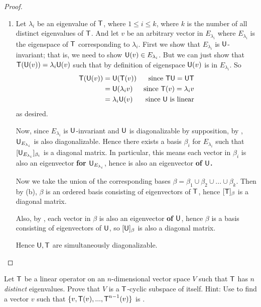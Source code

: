 \begin{proof} \ 

\begin{enumerate}
\item

Let \(\lambda_i\) be an eigenvalue of \(\textsf{T}\), where \(1 \le i \le k\), where \(k\) is the number of all distinct eigenvalues of \(\textsf{T}\).
And let \(v\) be an arbitrary vector in \(E_{\lambda_i}\) where \(E_{\lambda_i}\) is the eigenspace of \(\textsf{T}\) corresponding to \(\lambda_i\).
First we show that \(E_{\lambda_i}\) is \(\textsf{U}\)-invariant; that is, we need to show \(\textsf{U}(v) \in E_{\lambda_i}\).
But we can just show that \(\textsf{T}(\textsf{U}(v)) = \lambda_i \textsf{U}(v)\) such that by definition of eigenspace \(\textsf{U}(v)\) is in \(E_{\lambda_i}\).
So
\begin{align*}
    \textsf{T}(\textsf{U}(v))
        & = \textsf{U}(\textsf{T}(v)) & \text{since \(\textsf{T}\textsf{U}= \textsf{U}\textsf{T}\)} \\
        & = \textsf{U}( \lambda_i v ) & \text{since \(\textsf{T}(v) = \lambda_i v\)} \\
        & = \lambda_i \textsf{U}(v) & \text{since \(\textsf{U}\) is linear}
\end{align*}
as desired.

Now, since \(E_{\lambda_i}\) is \(\textsf{U}\)-invariant and \(\textsf{U}\) is diagonalizable by supposition, by , \(\textsf{U}_{E_{\lambda_i}}\) is also diagonalizable.
Hence there exists a basis \(\beta_i\) for \(E_{\lambda_i}\) such that \([\textsf{U}_{E_{\lambda_i}}]_{\beta_i}\) is a diagonal matrix.
In particular, this means each vector in \(\beta_i\) is also an eigenvector \textbf{for \(\textsf{U}_{E_{\lambda_i}}\)}, hence is also an eigenvector \textbf{of \(\textsf{U}\).} 


Now we take the union of the corresponding bases \(\beta = \beta_1 \cup \beta_2 \cup ... \cup \beta_k\).
Then by (b), \(\beta\) is an ordered basis consisting of eigenvectors of \(\textsf{T}\), hence \([\textsf{T}]_{\beta}\) is a diagonal matrix.

Also, by , each vector in \(\beta\) is also an eigenvector \textbf{of \(\textsf{U}\)}, hence \(\beta\) is a basis consisting of eigenvectors of \(\textsf{U}\), so \([\textsf{U}]_{\beta}\) is also a diagonal matrix.

Hence \(\textsf{U}, \textsf{T}\) are simultaneously diagonalizable.
\end{enumerate}
\end{proof}

\begin{exercise} \label{exercise 5.4.26}
Let \(\textsf{T}\) be a linear operator on an \(n\)-dimensional vector space \(V\) such that \(\textsf{T}\) has \(n\) \emph{distinct} eigenvalues.
Prove that \(V\) is a \(\textsf{T}\)-cyclic subspace of itself.
Hint: Use  to find a vector \(v\) such that \(\{ v, \textsf{T}(v), ..., \textsf{T}^{n-1}(v) \}\) is \LID{}.
\end{exercise}

